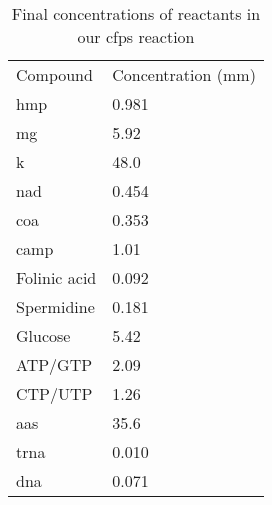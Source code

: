 \appendix

\begin{table}[]
\centering
\caption{Final concentrations of reactants in our \gls{cfps} reaction}
\label{tab:cf-conc}
\begin{tabular}{ll}
Compound     & Concentration (\gls{mm}) \\
\gls{hmp}           & 0.981              \\
\gls{mg}           & 5.92               \\
\gls{k}           & 48.0               \\
\gls{nad}          & 0.454              \\
\gls{coa}          & 0.353              \\
\gls{camp}         & 1.01               \\
Folinic acid & 0.092              \\
Spermidine   & 0.181              \\
Glucose      & 5.42               \\
ATP/GTP      & 2.09               \\
CTP/UTP      & 1.26               \\
\glspl{aa}  & 35.6               \\
\gls{trna}        & 0.010              \\
\gls{dna}          & 0.071             
\end{tabular}
\end{table}